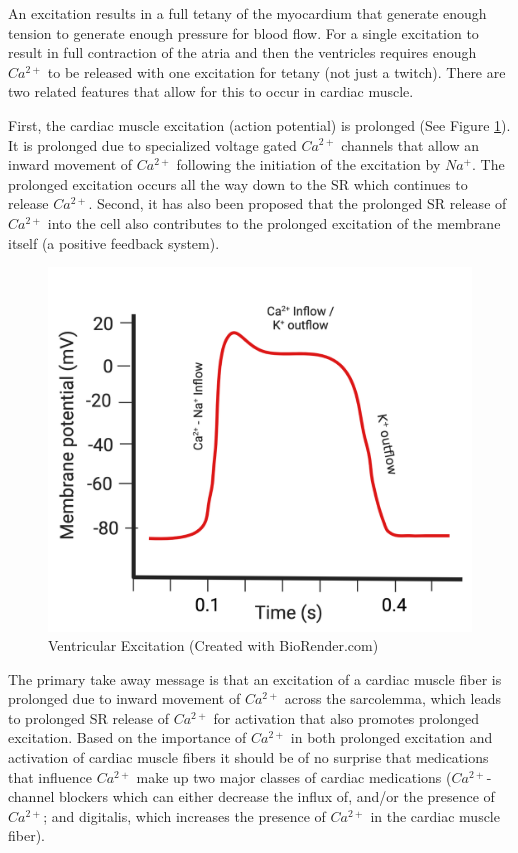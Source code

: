 An excitation results in a full tetany of the myocardium that generate enough tension to generate enough pressure for blood flow. For a single excitation to result in full contraction of the atria and then the ventricles requires enough $Ca^{2+}$ to be released with one excitation for tetany (not just a twitch). There are two related features that allow for this to occur in cardiac muscle. 

First, the cardiac muscle excitation (action potential) is prolonged (See Figure \ref{fig:Cardiac_Ventricular_AP}). It is prolonged due to specialized voltage gated $Ca^{2+}$ channels that allow an inward movement of $Ca^{2+}$ following the initiation of the excitation by $Na^+$. The prolonged excitation occurs all the way down to the SR which continues to release $Ca^{2+}$. Second, it has also been proposed that the prolonged SR release of $Ca^{2+}$ into the cell also contributes to the prolonged excitation of the membrane itself (a positive feedback system). 

\begin{figure}[!h]
    \centering
    \includegraphics[width=0.5\linewidth]{./figure/Cardiac_Ventricular_AP.png}
    \caption{Ventricular Excitation \footnotesize{(Created with BioRender.com)}}
    \label{fig:Cardiac_Ventricular_AP}
\end{figure}

The primary take away message is that an excitation of a cardiac muscle fiber is prolonged due to inward movement of $Ca^{2+}$ across the sarcolemma, which leads to prolonged SR release of $Ca^{2+}$ for activation that also promotes prolonged excitation. Based on the importance of $Ca^{2+}$ in both prolonged excitation and activation of cardiac muscle fibers it should be of no surprise that medications that influence $Ca^{2+}$ make up two major classes of cardiac medications ($Ca^{2+}$-channel blockers which can either decrease the influx of, and/or the presence of $Ca^{2+}$; and digitalis, which increases the presence of $Ca^{2+}$ in the cardiac muscle fiber).


